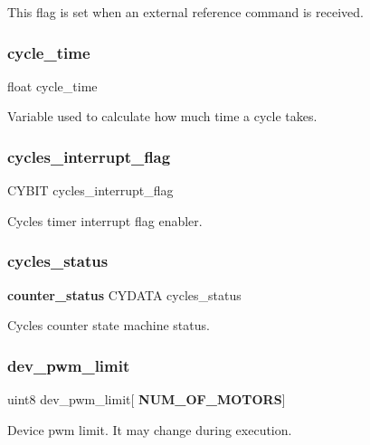 This flag is set when an external reference command is received. \mbox{\label{globals_8h_a910e6d34a0bb2e8dbaf576e06bdf56f5}} 
\subsubsection{cycle\+\_\+time}
{\footnotesize\ttfamily float cycle\+\_\+time}

Variable used to calculate how much time a cycle takes. \mbox{\label{globals_8h_a9c58c534e60c7991a92a13d012e7ef86}} 
\subsubsection{cycles\+\_\+interrupt\+\_\+flag}
{\footnotesize\ttfamily C\+Y\+B\+IT cycles\+\_\+interrupt\+\_\+flag}

Cycles timer interrupt flag enabler. \mbox{\label{globals_8h_a9087b28d15f17c6475922ba6943b14f3}} 
\subsubsection{cycles\+\_\+status}
{\footnotesize\ttfamily \textbf{ counter\+\_\+status} C\+Y\+D\+A\+TA cycles\+\_\+status}

Cycles counter state machine status. \mbox{\label{globals_8h_ac7fdc35fc8e87ead9b45028d6034fb1b}} 
\subsubsection{dev\+\_\+pwm\+\_\+limit}
{\footnotesize\ttfamily uint8 dev\+\_\+pwm\+\_\+limit[\textbf{ N\+U\+M\+\_\+\+O\+F\+\_\+\+M\+O\+T\+O\+RS}]}

Device pwm limit. It may change during execution. \mbox{\label{globals_8h_a2e254e60f92958e2fdec99dde626dca6}} 
